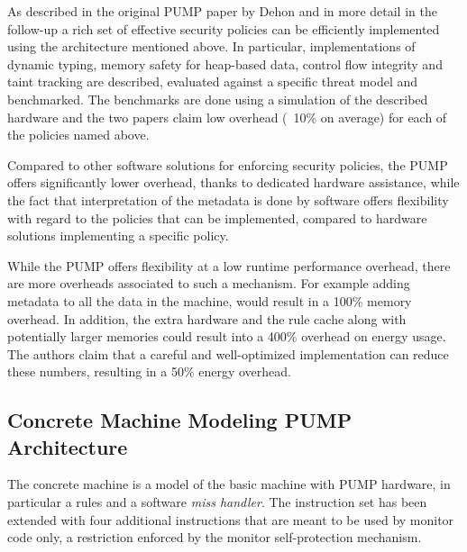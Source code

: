 As described in the original PUMP paper by Dehon \ETAL \cite{pump_hasp2014} and 
in more detail in the follow-up \cite{pump_ccs2014} a rich set of effective 
security policies can be efficiently implemented using the architecture 
mentioned above. In particular, implementations of dynamic typing, memory safety
for heap-based data, control flow integrity and taint tracking are described, 
evaluated against a specific threat model and benchmarked. The benchmarks are
done using a simulation of the described hardware and the two papers claim low
overhead (~10\% on average) for each of the policies named above.

Compared to other software solutions for enforcing security policies, the PUMP 
offers  significantly lower overhead, thanks to dedicated hardware assistance, 
while the fact that interpretation of the metadata is done by software offers 
flexibility with regard to the policies that can be implemented, compared to 
hardware solutions implementing a specific policy.

While the PUMP offers flexibility at a low runtime performance overhead, 
there are more overheads associated to such a mechanism. For example adding 
metadata to all the data in the machine, would result in a 100\% memory overhead.
In addition, the extra hardware and the rule cache along with potentially larger
memories could result into a 400\% overhead on energy usage. \cite{pump_ccs2014}
The authors claim that a careful and well-optimized implementation can reduce 
these numbers, resulting in a 50\% energy overhead.
%

\subsection{Concrete Machine Modeling PUMP Architecture}\label{sec:concrete}

The concrete machine is a model of the basic machine with PUMP hardware, 
in particular a rules \cache and a software \emph{miss handler}. 
The instruction set has been extended with four additional instructions that 
are meant to be used by monitor code only, a restriction enforced by the monitor
self-protection mechanism.

